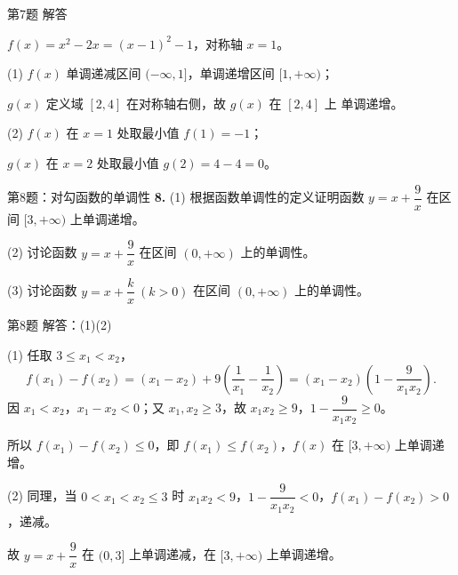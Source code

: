 \documentclass[10pt,aspectratio=169,serif,fleqn]{beamer}
\begin{document}
\begin{frame}[t]{第7题 解答}
\begin{tcolorbox}[colback=orange!10,colframe=orange,title=\textbf{解}]
$f(x)=x^2-2x=(x-1)^2-1$，对称轴 $x=1$。

\vspace{0.3em}
(1) $f(x)$ 单调递减区间 $(-\infty,1]$，单调递增区间 $[1,+\infty)$；

\vspace{0.3em}
$g(x)$ 定义域 $[2,4]$ 在对称轴右侧，故 $g(x)$ 在 $[2,4]$ 上 \alert{单调递增}。

\vspace{0.8em}
(2) $f(x)$ 在 $x=1$ 处取最小值 $f(1)=-1$；

$g(x)$ 在 $x=2$ 处取最小值 $g(2)=4-4=0$。
\end{tcolorbox}
\end{frame}

\begin{frame}[t]{第8题：对勾函数的单调性}
\textbf{8.} (1) 根据函数单调性的定义证明函数 $y=x+\dfrac{9}{x}$ 在区间 $[3,+\infty)$ 上单调递增。

\vspace{0.5em}
(2) 讨论函数 $y=x+\dfrac{9}{x}$ 在区间 $(0,+\infty)$ 上的单调性。

\vspace{0.5em}
(3) 讨论函数 $y=x+\dfrac{k}{x}\ (k>0)$ 在区间 $(0,+\infty)$ 上的单调性。
\end{frame}

\begin{frame}[t]{第8题 解答：(1)(2)}\vspace{-2em}
\begin{tcolorbox}[colback=orange!10,colframe=orange,title=\textbf{解}]
(1) 任取 $3\le x_1<x_2$，
\[
f(x_1)-f(x_2)=(x_1-x_2)+9\left(\frac1{x_1}-\frac1{x_2}\right)=(x_1-x_2)\left(1-\frac{9}{x_1x_2}\right).
\]
因 $x_1<x_2$，$x_1-x_2<0$；又 $x_1,x_2\ge3$，故 $x_1x_2\ge9$，$1-\dfrac{9}{x_1x_2}\ge0$。

\vspace{0.3em}
所以 $f(x_1)-f(x_2)\le0$，即 $f(x_1)\le f(x_2)$，$f(x)$ 在 $[3,+\infty)$ 上单调递增。

\vspace{0.8em}
(2) 同理，当 $0<x_1<x_2\le3$ 时 $x_1x_2<9$，$1-\dfrac{9}{x_1x_2}<0$，$f(x_1)-f(x_2)>0$，递减。

\vspace{0.3em}
故 $y=x+\dfrac9x$ 在 $(0,3]$ 上单调递减，在 $[3,+\infty)$ 上单调递增。
\end{tcolorbox}
\end{frame}
\end{document}
